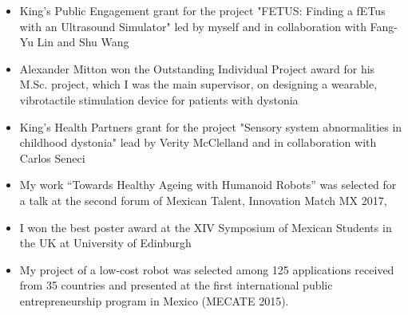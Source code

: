 \documentclass{mycv}
\begin{document}
\begin{itemize}
\item King's Public Engagement grant for the project "FETUS: Finding a fETus with an Ultrasound Simulator" led by myself and in collaboration with Fang-Yu Lin and Shu Wang \href{https://cai4cai.ml/post/2021-01-07-miguelpegrant/}{\faExternalLink} 

\item Alexander Mitton won the Outstanding Individual Project award for his M.Sc. project, which I was the main supervisor, on designing a wearable, vibrotactile stimulation device for patients with dystonia \href{https://www.kcl.ac.uk/news/mscmres-healthcare-technologies-award-student-prizes-for-outstanding-performance-and-contributions-to-student-life}{\faExternalLink} 

\item King's Health Partners grant for the project "Sensory system abnormalities in childhood dystonia" lead by Verity McClelland and in collaboration with Carlos Seneci \href{https://kclpure.kcl.ac.uk/portal/en/persons/miguel-angel-perez-xochicale(cca72683-31b7-496a-8aeb-181fd9d6a8f3)/projects.html}{\faExternalLink} 

\item My work ``Towards Healthy Ageing with Humanoid Robots'' was selected for a talk at the second forum of Mexican Talent, Innovation Match MX 2017, \href{https://github.com/mxochicale/InnovationMatchMX/tree/master/2017}{\faExternalLink} \href{https://github.com/mxochicale/InnovationMatchMX/blob/master/2017/presentation/IMMX-MA-0058.pdf}{\faFilePdfO} \href{https://www.youtube.com/watch?v=wNWzpdXdm5U}{\faYoutube} 

\item I won the best poster award at the XIV Symposium of Mexican Students in the UK at University of Edinburgh \href{https://github.com/mxochicale/symposiummx/tree/master/2016}{\faExternalLink}  

\item My project of a low-cost robot was selected among 125 applications received from 35 countries and presented at the first international public entrepreneurship program in Mexico (MECATE 2015). \href{http://let-emprendimientopublico.mx/en/portfolio_category/mecate-primera-generacion-en/}{\faExternalLink} \href{https://www.youtube.com/watch?v=VjVGnwD422g}{\faYoutube} 


\end{itemize}
\end{document}
